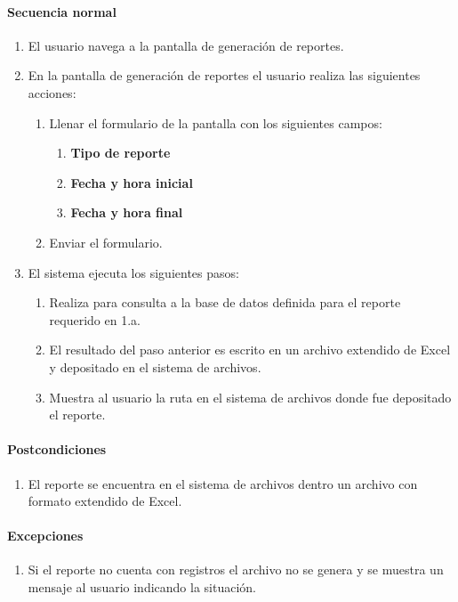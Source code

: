 \paragraph{Secuencia normal}
\begin{enumerate}
  \item El usuario navega a la pantalla de generación de reportes.
  \item En la pantalla de generación de reportes el usuario realiza las siguientes acciones:
    \begin{enumerate}
    \item Llenar el formulario de la pantalla con los siguientes campos:
    \begin{enumerate}
      \item \textbf{Tipo de reporte}
      \item \textbf{Fecha y hora inicial}
      \item \textbf{Fecha y hora final}
    \end{enumerate}
    \item Enviar el formulario.
  \end{enumerate}
  \item El sistema ejecuta los siguientes pasos:
  \begin{enumerate}
    \item Realiza para consulta a la base de datos definida para el reporte requerido en 1.a.
    \item El resultado del paso anterior es escrito en un archivo extendido de Excel y depositado en el sistema de archivos.
    \item Muestra al usuario la ruta en el sistema de archivos donde fue depositado el reporte.
  \end{enumerate}
\end{enumerate}
\paragraph{Postcondiciones}
\begin{enumerate}
  \item El reporte se encuentra en el sistema de archivos dentro un archivo con formato extendido de Excel.
\end{enumerate}
\paragraph{Excepciones}
\begin{enumerate}
  \item Si el reporte no cuenta con registros el archivo no se genera y se muestra un mensaje al usuario indicando la situación.
\end{enumerate}


